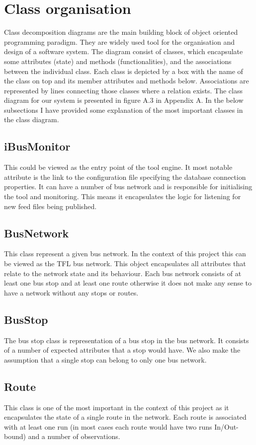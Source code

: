 \section{Class organisation}
Class decomposition diagrams are the main building block of object oriented programming paradigm. They are widely used tool for the organisation and design of a software system. The diagram consist of classes, which encapsulate some attributes (state) and methods (functionalities), and the associations between the individual class. Each class is depicted by a box with the name of the class on top and its member attributes and methods below. Associations are represented by lines connecting those classes where a relation exists. The class diagram for our system is presented in figure A.3 in Appendix A. In the below subsections I have provided some explanation of the most important classes in the class diagram.

\subsection{iBusMonitor}
This could be viewed as the entry point of the tool engine. It most notable attribute is the link to the configuration file specifying the database connection properties. It can have a number of bus network and is responsible for initialising the tool and monitoring. This means it encapsulates the logic for listening for new feed files being published.

\subsection{BusNetwork}
This class represent a given bus network. In the context of this project this can be viewed as the TFL bus network. This object encapsulates all attributes that relate to the network state and its behaviour. Each bus network consists of at least one bus stop and at least one route otherwise it does not make any sense to have a network without any stops or routes.

\subsection{BusStop}
The bus stop class is representation of a bus stop in the bus network. It consists of a number of expected attributes that a stop would have. We also make the assumption that a single stop can belong to only one bus network.

\subsection{Route}
This class is one of the most important in the context of this project as it encapsulates the state of a single route in the network. Each route is associated with at least one run (in most cases each route would have two runs In/Out-bound) and a number of observations. 

